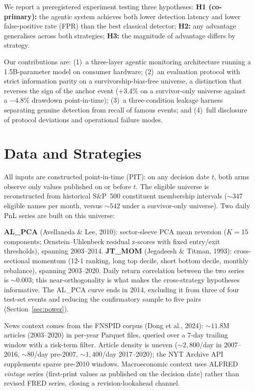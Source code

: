 \documentclass[10pt,a4paper]{article}
\begin{document}
We report a preregistered experiment testing three hypotheses:
\textbf{H1 (co-primary):} the agentic system achieves both lower detection
latency and lower false-positive rate (FPR) than the best classical detector;
\textbf{H2:} any advantage generalises across both strategies;
\textbf{H3:} the magnitude of advantage differs by strategy.

Our contributions are: (1)~a three-layer agentic monitoring architecture running
a 1.5B-parameter model on consumer hardware; (2)~an evaluation protocol with
strict information parity on a survivorship-bias-free universe, a distinction
that reverses the sign of the anchor event ($+3.4\%$ on a survivor-only universe
against a $-4.8\%$ drawdown point-in-time); (3)~a three-condition leakage
harness separating genuine detection from recall of famous events; and (4)~full
disclosure of protocol deviations and operational failure modes.

\section{Data and Strategies}\label{sec:data}

All inputs are constructed point-in-time (PIT): on any decision date $t$, both
arms observe only values published on or before $t$. The eligible universe is
reconstructed from historical S\&P~500 constituent membership intervals
(${\sim}347$ eligible names per month, versus ${\sim}542$ under a survivor-only
universe). Two daily PnL series are built on this universe:

\textbf{AL\_PCA} (Avellaneda \& Lee, 2010): sector-sleeve PCA mean reversion
($K = 15$ components; Ornstein--Uhlenbeck residual z-scores with fixed
entry/exit thresholds), spanning 2003--2014.
\textbf{JT\_MOM} (Jegadeesh \& Titman, 1993): cross-sectional momentum (12-1
ranking, long top decile, short bottom decile, monthly rebalance), spanning
2003--2020. Daily return correlation between the two series is ${\sim}0.003$;
this near-orthogonality is what makes the cross-strategy hypotheses informative.
The AL\_PCA curve ends in 2014, excluding it from three of four test-set events
and reducing the confirmatory sample to five pairs (Section~\ref{sec:power}).

News context comes from the FNSPID corpus (Dong et al., 2024): ${\sim}11.8$M
articles (2003--2020) in per-year Parquet files, queried over a 7-day trailing
window with a risk-term filter. Article density is uneven (${\sim}2{,}800$/day
in 2007--2016, ${\sim}80$/day pre-2007, ${\sim}1{,}400$/day 2017--2020); the NYT
Archive API supplements sparse pre-2010 windows. Macroeconomic context uses
ALFRED \emph{vintage} series (first-print values as published on the decision
date) rather than revised FRED series, closing a revision-lookahead channel.
\end{document}
